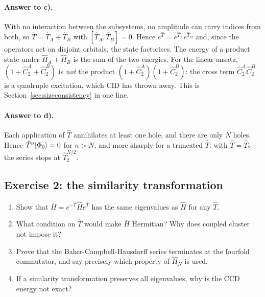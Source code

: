 \paragraph{Answer to c).}
With no interaction between the subsystems, no amplitude can carry indices
from both, so $\hat{T}=\hat{T}_A+\hat{T}_B$ with $[\hat{T}_A,\hat{T}_B]=0$.
Hence $e^{\hat{T}}=e^{\hat{T}_A}e^{\hat{T}_B}$ and, since the operators act
on disjoint orbitals, the state factorises.  The energy of a product state
under $\hat{H}_A+\hat{H}_B$ is the sum of the two energies.  For the linear
ansatz, $(1+\hat{C}_2^A+\hat{C}_2^B)$ is \emph{not} the product
$(1+\hat{C}_2^A)(1+\hat{C}_2^B)$: the cross term
$\hat{C}_2^A\hat{C}_2^B$ is a quadruple excitation, which CID has thrown
away.  This is Section~\ref{sec:sizeconsistency} in one line.

\paragraph{Answer to d).}
Each application of $\hat{T}$ annihilates at least one hole, and there are
only $N$ holes.  Hence $\hat{T}^{n}\vert \Phi_0 \rangle=0$ for $n>N$, and more
sharply for a truncated $\hat{T}$: with $\hat{T}=\hat{T}_2$ the series stops
at $\hat{T}_2^{N/2}$.

\subsection*{Exercise 2: the similarity transformation}
\label{ex:10-similarity}

\begin{enumerate}
  \item[a)] Show that $\overline{H}=e^{-\hat{T}}\hat{H}e^{\hat{T}}$ has the
  same eigenvalues as $\hat{H}$ for any $\hat{T}$.
  \item[b)] What condition on $\hat{T}$ would make $\overline{H}$ Hermitian?
  Why does coupled cluster not impose it?
  \item[c)] Prove that the Baker-Campbell-Hausdorff series terminates at the
  fourfold commutator, and say precisely which property of $\hat{H}_N$ is
  used.
  \item[d)] If a similarity transformation preserves all eigenvalues, why is
  the CCD energy not exact?
\end{enumerate}

